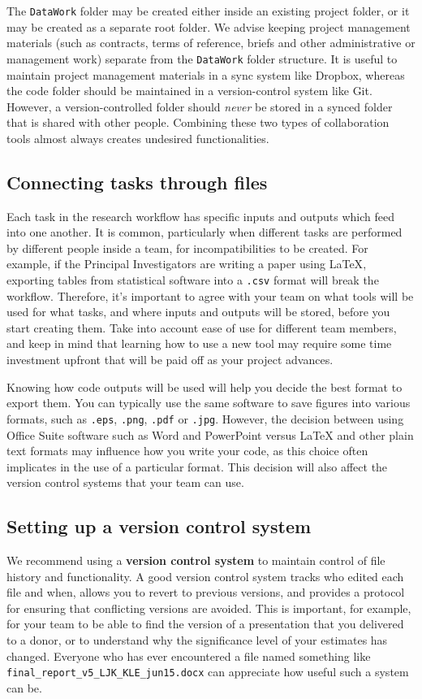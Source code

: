 The \texttt{DataWork} folder may be created either inside
an existing project folder, or it may be created as a separate root folder.
We advise keeping project management materials
(such as contracts, terms of reference, briefs and other administrative or management work)
separate from the \texttt{DataWork} folder structure.
It is useful to maintain project management materials in a sync system like Dropbox,
whereas the code folder should be maintained in a version-control system like Git.
However, a version-controlled folder should \textit{never}
be stored in a synced folder that is shared with other people.
Combining these two types of collaboration tools
almost always creates undesired functionalities.

\subsection{Connecting tasks through files}
Each task in the research workflow has specific inputs and outputs
which feed into one another.
It is common, particularly when different tasks are performed by different people inside a team,
for incompatibilities to be created.
For example, if the Principal Investigators are writing a paper using {\LaTeX},
exporting tables from statistical software into a \texttt{.csv} format will break the workflow.
Therefore, it's important to agree with your team on what tools will be used for what tasks,
and where inputs and outputs will be stored, before you start creating them.
Take into account ease of use for different team members,
and keep in mind that learning how to use a new tool may require some time investment upfront that will be paid off as your project advances.

Knowing how code outputs will be used will help you decide the best format to export them.
You can typically use the same software to save figures into various formats,
such as \texttt{.eps}, \texttt{.png}, \texttt{.pdf} or \texttt{.jpg}.
However, the decision between using Office Suite software
such as Word and PowerPoint versus {\LaTeX} and other plain text formats
may influence how you write your code,
as this choice often implicates in the use of a particular format.
This decision will also affect the version control systems that your team can use.


\subsection{Setting up a version control system}
We recommend using a \textbf{version control system} to
maintain control of file history and functionality.
A good version control system tracks who edited each file and when,
allows you to revert to previous versions,
and provides a protocol for ensuring that conflicting versions are avoided.
This is important, for example, for your team
to be able to find the version of a presentation that you delivered to a donor,
or to understand why the significance level of your estimates has changed.
Everyone who has ever encountered a file named something like \texttt{final\_report\_v5\_LJK\_KLE\_jun15.docx}
can appreciate how useful such a system can be.

